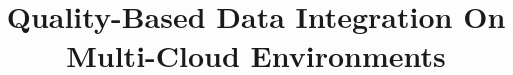 \documentclass{vldb}
\begin{document}
 
 

\title{Quality-Based Data Integration On Multi-Cloud Environments}



%
%
% 
%
 
\end{document}
